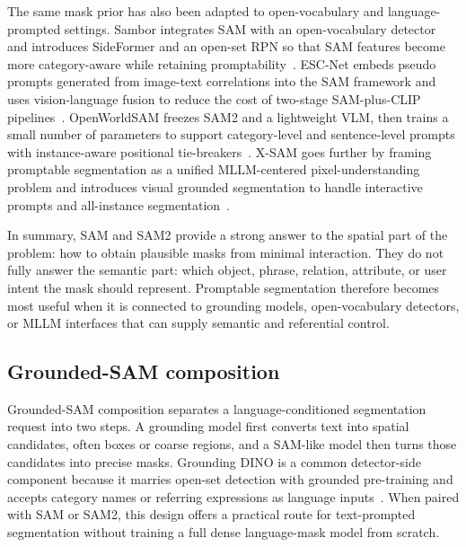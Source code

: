 The same mask prior has also been adapted to open-vocabulary and language-prompted settings. Sambor integrates SAM with an open-vocabulary detector and introduces SideFormer and an open-set RPN so that SAM features become more category-aware while retaining promptability~\citep{xhanBoostingSegmentAnything2025}. ESC-Net embeds pseudo prompts generated from image-text correlations into the SAM framework and uses vision-language fusion to reduce the cost of two-stage SAM-plus-CLIP pipelines~\citep{mleeEffectiveSAMCombination2025}. OpenWorldSAM freezes SAM2 and a lightweight VLM, then trains a small number of parameters to support category-level and sentence-level prompts with instance-aware positional tie-breakers~\citep{sgxiaoOpenworldsamExtendingSam22026}. X-SAM goes further by framing promptable segmentation as a unified MLLM-centered pixel-understanding problem and introduces visual grounded segmentation to handle interactive prompts and all-instance segmentation~\citep{hwangXSAMSegmentAnything2026}.

In summary, SAM and SAM2 provide a strong answer to the spatial part of the problem: how to obtain plausible masks from minimal interaction. They do not fully answer the semantic part: which object, phrase, relation, attribute, or user intent the mask should represent. Promptable segmentation therefore becomes most useful when it is connected to grounding models, open-vocabulary detectors, or MLLM interfaces that can supply semantic and referential control.

\subsection{Grounded-SAM composition}

Grounded-SAM composition separates a language-conditioned segmentation request into two steps. A grounding model first converts text into spatial candidates, often boxes or coarse regions, and a SAM-like model then turns those candidates into precise masks. Grounding DINO is a common detector-side component because it marries open-set detection with grounded pre-training and accepts category names or referring expressions as language inputs~\citep{liu2024groundingdino}. When paired with SAM or SAM2, this design offers a practical route for text-prompted segmentation without training a full dense language-mask model from scratch.




